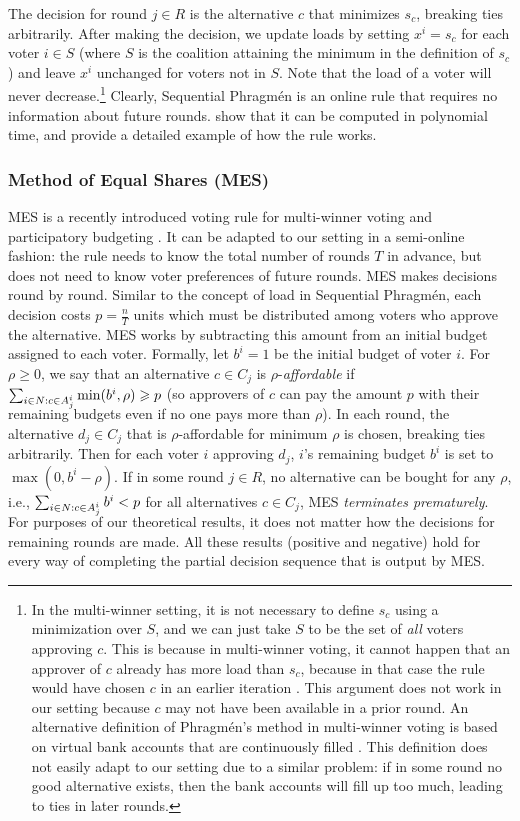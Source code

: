 \documentclass[10pt]{scrartcl}
\theoremstyle{plain}
\theoremstyle{definition}
\renewcommand*{\ge}{\geqslant}
\renewcommand*{\geq}{\geqslant}
\begin{document}
The decision for round $j \in R$ is the alternative $c$ that minimizes $s_c$, breaking ties arbitrarily. After making the decision, we update loads by setting $x^i = s_c$ for each voter $i \in S$ (where $S$ is the coalition attaining the minimum in the definition of $s_c$) and leave $x^i$ unchanged for voters not in $S$. 
Note that the load of a voter will never decrease.\footnote{In the multi-winner setting, it is not necessary to define $s_c$ using a minimization over $S$, and we can just take $S$ to be the set of \emph{all} voters approving $c$. This is because in multi-winner voting, it cannot happen that an approver of $c$ already has more load than $s_c$, because in that case the rule would have chosen $c$ in an earlier iteration \citep[Lemma 4.5]{brill2023phragmen}. This argument does not work in our setting because $c$ may not have been available in a prior round. An alternative definition of Phragm\'en's method in multi-winner voting is based on virtual bank accounts that are continuously filled \citep{Jans16a,PeSk20}. This definition does not easily adapt to our setting due to a similar problem: if in some round no good alternative exists, then the bank accounts will fill up too much, leading to ties in later rounds.}
Clearly, Sequential Phragm\'en is an online rule that requires no information about future rounds. \citet{lacknermaly2023} show that it can be computed in polynomial time, and provide a detailed example of how the rule works.

\subsubsection{Method of Equal Shares (MES)}
MES is a recently introduced voting rule for multi-winner voting \citep{PeSk20} and participatory budgeting \citep{peters2021proportional}. It can be adapted to our setting in a semi-online fashion: the rule needs to know the total number of rounds $T$ in advance, but does not need to know voter preferences of future rounds. MES makes decisions round by round. Similar to the concept of load in Sequential Phragm\'en, each decision costs $p=\frac{n}{T}$ units which must be distributed among voters who approve the alternative. MES works by subtracting this amount from an initial budget assigned to each voter. Formally, let $b^i = 1$ be the initial budget of voter $i$. 
For $\rho \ge 0$, we say that an alternative $c \in C_j$ is $\rho$-\emph{affordable} if $\smash{\sum_{i \in N : c \in A^i_j} \min(b^i, \rho)} \geq p$ (so approvers of $c$ can pay the amount $p$ with their remaining budgets even if no one pays more than $\rho$). 
In each round, the alternative $d_j \in C_j$ that is $\rho$-affordable for minimum $\rho$ is chosen, breaking ties arbitrarily. Then for each voter $i$ approving $d_j$, $i$'s remaining budget $b^i$ is set to $\max(0, b^i - \rho)$.
If in some round $j \in R$, no alternative can be bought for any $\rho$, i.e., $\smash{\sum_{i \in N : c \in A^i_j} b^i} < p$ for all alternatives $c \in C_j$, MES \emph{terminates prematurely}. For purposes of our theoretical results, it does not matter how the decisions for remaining rounds are made. All these results (positive and negative) hold for every way of completing the partial decision sequence that is output by MES. 
\end{document}
